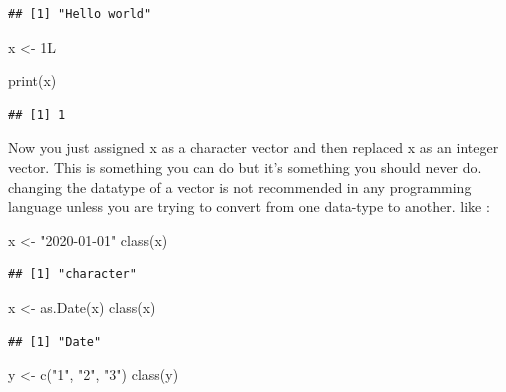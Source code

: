 \documentclass[
]{book}
\newenvironment{Shaded}{\begin{snugshade}}{\end{snugshade}}
\newcommand{\FunctionTok}[1]{\textcolor[rgb]{0.00,0.00,0.00}{#1}}
\newcommand{\NormalTok}[1]{#1}
\newcommand{\OtherTok}[1]{\textcolor[rgb]{0.56,0.35,0.01}{#1}}
\newcommand{\StringTok}[1]{\textcolor[rgb]{0.31,0.60,0.02}{#1}}
\begin{document}
\begin{verbatim}
## [1] "Hello world"
\end{verbatim}

\begin{Shaded}
\begin{Highlighting}[]
\NormalTok{x }\OtherTok{\textless{}{-}}\NormalTok{ 1L}

\FunctionTok{print}\NormalTok{(x)}
\end{Highlighting}
\end{Shaded}

\begin{verbatim}
## [1] 1
\end{verbatim}

Now you just assigned x as a character vector and then replaced x as an integer vector. This is something you can do but it's something you should never do. changing the datatype of a vector is not recommended in any programming language unless you are trying to convert from one data-type to another. like :

\begin{Shaded}
\begin{Highlighting}[]
\NormalTok{x }\OtherTok{\textless{}{-}} \StringTok{"2020{-}01{-}01"}
\FunctionTok{class}\NormalTok{(x)}
\end{Highlighting}
\end{Shaded}

\begin{verbatim}
## [1] "character"
\end{verbatim}

\begin{Shaded}
\begin{Highlighting}[]
\NormalTok{x }\OtherTok{\textless{}{-}} \FunctionTok{as.Date}\NormalTok{(x)}
\FunctionTok{class}\NormalTok{(x)}
\end{Highlighting}
\end{Shaded}

\begin{verbatim}
## [1] "Date"
\end{verbatim}

\begin{Shaded}
\begin{Highlighting}[]
\NormalTok{y }\OtherTok{\textless{}{-}} \FunctionTok{c}\NormalTok{(}\StringTok{"1"}\NormalTok{, }\StringTok{"2"}\NormalTok{, }\StringTok{"3"}\NormalTok{)}
\FunctionTok{class}\NormalTok{(y)}
\end{Highlighting}
\end{Shaded}
\end{document}
